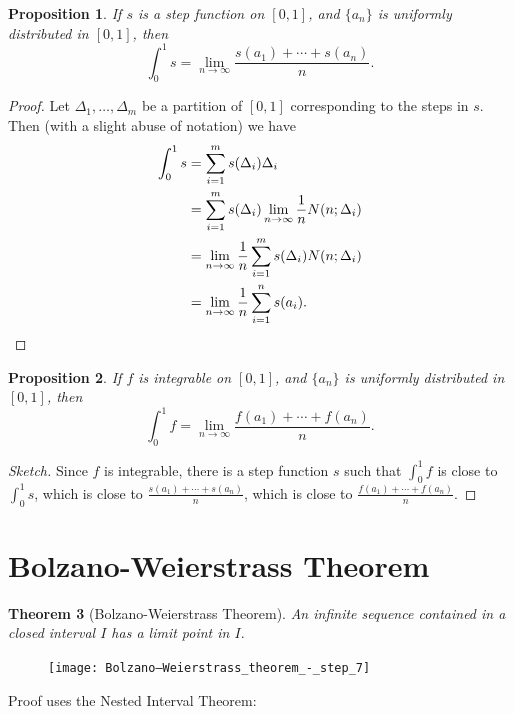 \documentclass[12pt]{article}
\theoremstyle{plain}
\newtheorem{theorem}{Theorem}
\newtheorem{proposition}[theorem]{Proposition}
\theoremstyle{definition}
\theoremstyle{remark}
\begin{document}
\begin{proposition}
If $s$ is a step function on $[0, 1]$, and $\{a_n\}$ is uniformly distributed in $[0, 1]$, then $$\int_0^1 s = \lim_{n\to\infty} \frac{s(a_1) + \cdots + s(a_n)}{n}.$$
\end{proposition}

\begin{proof}
Let $\Delta_1, \ldots, \Delta_m$ be a partition of $[0, 1]$ corresponding to the steps in $s.$ Then (with a slight abuse of notation) we have 
\begin{align*}
\int_0^1 s &= \sum_{i=1}^m s(\Delta_i) \Delta_i \\
&= \sum_{i=1}^m s(\Delta_i) \lim_{n \to \infty} \frac{1}{n} N(n; \Delta_i) \\
&= \lim_{n \to \infty} \frac{1}{n} \sum_{i=1}^m s(\Delta_i) N(n; \Delta_i) \\
&= \lim_{n \to \infty} \frac{1}{n} \sum_{i=1}^n s(a_i).\qedhere
\end{align*}
\end{proof}

\begin{proposition}
If $f$ is integrable on $[0, 1]$, and $\{a_n\}$ is uniformly distributed in $[0, 1]$, then $$\int_0^1 f = \lim_{n\to\infty} \frac{f(a_1) + \cdots + f(a_n)}{n}.$$
\end{proposition}

\begin{proof}[Sketch]
Since $f$ is integrable, there is a step function $s$ such that $\int_0^1 f$ is close to $\int_0^1 s$, which is close to $\frac{s(a_1) + \cdots + s(a_n)}{n}$, which is close to $\frac{f(a_1) + \cdots + f(a_n)}{n}$.
\end{proof}

\section{Bolzano-Weierstrass Theorem}

\begin{theorem}[Bolzano-Weierstrass Theorem]
An infinite sequence contained in a closed interval $I$ has a limit point in $I.$
\end{theorem}

\begin{figure}[H]
\centering
\texttt{[image: Bolzano–Weierstrass\_theorem\_-\_step\_7]}
\end{figure}

Proof uses the Nested Interval Theorem:
\end{document}
